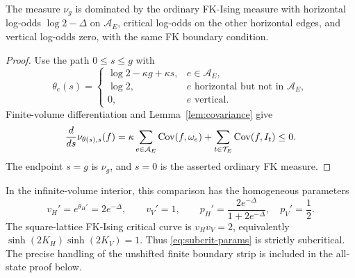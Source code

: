 \begin{proposition}\label{prop:strict}
The measure \(\nu_g\) is dominated by the ordinary FK-Ising measure with horizontal log-odds \(\log2-\Delta\) on \(\mathcal A_E\), critical log-odds on the other horizontal edges, and vertical log-odds zero, with the same FK boundary condition.
\end{proposition}
\begin{proof}
Use the path \(0\le s\le g\) with
\begin{equation}
 \theta_e(s)=
 \begin{cases}
 \log2-\kappa g+\kappa s,&e\in\mathcal A_E,\\
 \log2,&e\text{ horizontal but not in }\mathcal A_E,\\
 0,&e\text{ vertical}.
 \end{cases}
\end{equation}
Finite-volume differentiation and Lemma~\ref{lem:covariance} give
\begin{equation}
 \frac d{ds}\nu_{\theta(s),s}(f)
 =\kappa\sum_{e\in\mathcal A_E}\operatorname{Cov}(f,\omega_e)
    +\sum_{t\in\mathcal T_E}\operatorname{Cov}(f,I_t)
 \le0.
\end{equation}
The endpoint \(s=g\) is \(\nu_g\), and \(s=0\) is the asserted ordinary FK measure.
\end{proof}

In the infinite-volume interior, this comparison has the homogeneous parameters
\begin{equation}
 v_H'=e^{\theta_H'}=2e^{-\Delta},\qquad v_V'=1,
 \qquad p_H'=\frac{2e^{-\Delta}}{1+2e^{-\Delta}},\quad p_V'=\frac12.
 \label{eq:subcrit-params}
\end{equation}
The square-lattice FK-Ising critical curve is \(v_Hv_V=2\), equivalently
\(\sinh(2K_H)\sinh(2K_V)=1\). Thus \eqref{eq:subcrit-params} is strictly subcritical. The precise handling of the unshifted finite boundary strip is included in the all-state proof below.
